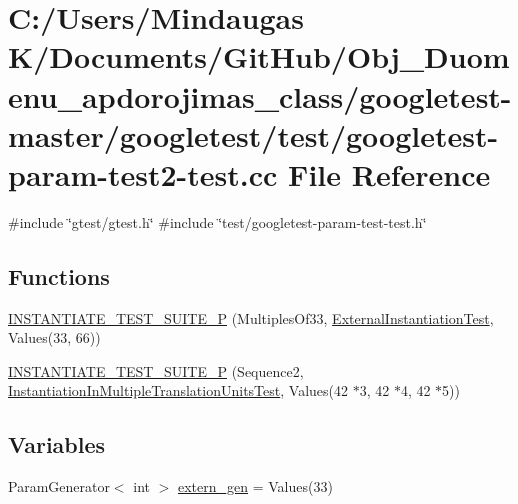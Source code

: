\hypertarget{googletest-master_2googletest_2test_2googletest-param-test2-test_8cc}{}\section{C\+:/\+Users/\+Mindaugas K/\+Documents/\+Git\+Hub/\+Obj\+\_\+\+Duomenu\+\_\+apdorojimas\+\_\+class/googletest-\/master/googletest/test/googletest-\/param-\/test2-\/test.cc File Reference}
\label{googletest-master_2googletest_2test_2googletest-param-test2-test_8cc}
{\ttfamily \#include \char`\"{}gtest/gtest.\+h\char`\"{}}\newline
{\ttfamily \#include \char`\"{}test/googletest-\/param-\/test-\/test.\+h\char`\"{}}\newline
\subsection*{Functions}
\begin{DoxyCompactItemize}
\item 
\mbox{\hyperlink{googletest-master_2googletest_2test_2googletest-param-test2-test_8cc_a9092fbc5f642e0be66474b214fae76c9}{I\+N\+S\+T\+A\+N\+T\+I\+A\+T\+E\+\_\+\+T\+E\+S\+T\+\_\+\+S\+U\+I\+T\+E\+\_\+P}} (Multiples\+Of33, \mbox{\hyperlink{class_external_instantiation_test}{External\+Instantiation\+Test}}, Values(33, 66))
\item 
\mbox{\hyperlink{googletest-master_2googletest_2test_2googletest-param-test2-test_8cc_a636f24ec7688ea5d70c09b8b73639e55}{I\+N\+S\+T\+A\+N\+T\+I\+A\+T\+E\+\_\+\+T\+E\+S\+T\+\_\+\+S\+U\+I\+T\+E\+\_\+P}} (Sequence2, \mbox{\hyperlink{class_instantiation_in_multiple_translation_units_test}{Instantiation\+In\+Multiple\+Translation\+Units\+Test}}, Values(42 $\ast$3, 42 $\ast$4, 42 $\ast$5))
\end{DoxyCompactItemize}
\subsection*{Variables}
\begin{DoxyCompactItemize}
\item 
Param\+Generator$<$ int $>$ \mbox{\hyperlink{googletest-master_2googletest_2test_2googletest-param-test2-test_8cc_a0f691f1461778d71f30b1fb1dea1cb50}{extern\+\_\+gen}} = Values(33)
\end{DoxyCompactItemize}


